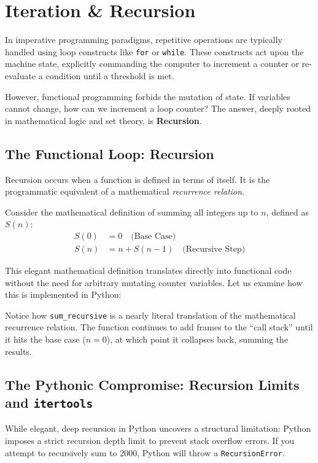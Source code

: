 \chapter{Iteration \& Recursion}
\label{ch:iteration}

In imperative programming paradigms, repetitive operations are typically handled using loop constructs like \texttt{for} or \texttt{while}. These constructs act upon the machine state, explicitly commanding the computer to increment a counter or re-evaluate a condition until a threshold is met. 

However, functional programming forbids the mutation of state. If variables cannot change, how can we increment a loop counter? The answer, deeply rooted in mathematical logic and set theory, is \textbf{Recursion}.

\section{The Functional Loop: Recursion}
Recursion occurs when a function is defined in terms of itself. It is the programmatic equivalent of a mathematical \textit{recurrence relation}. 

Consider the mathematical definition of summing all integers up to $n$, defined as $S(n)$:
\begin{align*}
S(0) &= 0 \quad \text{(Base Case)} \\
S(n) &= n + S(n-1) \quad \text{(Recursive Step)}
\end{align*}

This elegant mathematical definition translates directly into functional code without the need for arbitrary mutating counter variables. Let us examine how this is implemented in Python:



Notice how \texttt{sum\_recursive} is a nearly literal translation of the mathematical recurrence relation. The function continues to add frames to the ``call stack'' until it hits the base case ($n=0$), at which point it collapses back, summing the results.

\section{The Pythonic Compromise: Recursion Limits and \texttt{itertools}}
While elegant, deep recursion in Python uncovers a structural limitation: Python imposes a strict recursion depth limit to prevent stack overflow errors. If you attempt to recursively sum to 2000, Python will throw a \texttt{RecursionError}.

